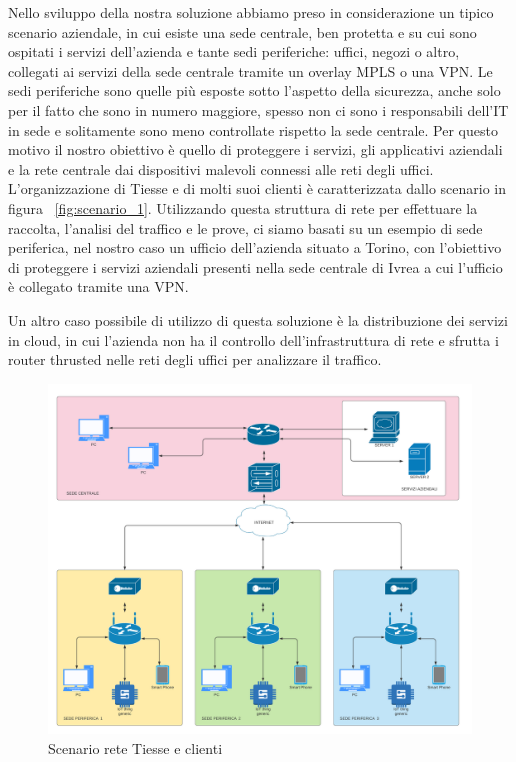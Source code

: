 Nello sviluppo della nostra soluzione abbiamo preso in considerazione un tipico scenario aziendale, in cui esiste una sede centrale, ben protetta e su cui sono ospitati i servizi dell'azienda e tante sedi periferiche: uffici, negozi o altro, collegati ai servizi della sede centrale tramite un overlay MPLS o una VPN.
Le sedi periferiche sono quelle più esposte sotto l'aspetto della sicurezza, anche solo per il fatto che sono in numero maggiore, spesso non ci sono i responsabili dell'IT in sede e solitamente sono meno controllate rispetto la sede centrale. Per questo motivo il nostro obiettivo è quello di proteggere i servizi, gli applicativi aziendali e la rete centrale dai dispositivi malevoli connessi alle reti degli uffici.
L'organizzazione di Tiesse e di molti suoi clienti è caratterizzata dallo scenario in figura ~\ref{fig:scenario_1}. Utilizzando questa struttura di rete per effettuare la raccolta, l'analisi del traffico e le prove, ci siamo basati su un esempio di sede periferica, nel nostro caso un ufficio dell'azienda situato a Torino, con l'obiettivo di proteggere i servizi aziendali presenti nella sede centrale di Ivrea a cui l'ufficio è collegato tramite una VPN.

Un altro caso possibile di utilizzo di questa soluzione è la distribuzione dei servizi in cloud, in cui l'azienda non ha il controllo dell'infrastruttura di rete e sfrutta i router thrusted nelle reti degli uffici per analizzare il traffico.


\begin{figure}[]
    \label{fig:scenario_2}
    \includegraphics[width=\hsize]{images/introduzione/scenario.png}
    \caption{Scenario rete Tiesse e clienti}
    \centering
\end{figure}

